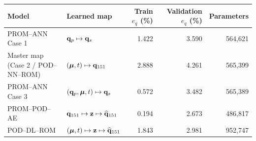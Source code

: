 \begin{tabular}{llrrr}
\toprule
Model & Learned map & Train $e_q$ (\%) & Validation $e_q$ (\%) & Parameters \\
\midrule
PROM--ANN Case 1 & $\mathbf q_p\mapsto\mathbf q_s$ & 1.422 & 3.590 & 564,621 \\
Master map (Case 2 / POD--NN--ROM) & $(\bm\mu,t)\mapsto\mathbf q_{151}$ & 2.888 & 4.261 & 565,399 \\
PROM--ANN Case 3 & $(\mathbf q_p,\bm\mu,t)\mapsto\mathbf q_s$ & 0.572 & 3.482 & 565,389 \\
PROM--POD--AE & $\mathbf q_{151}\mapsto\mathbf z\mapsto\widehat{\mathbf q}_{151}$ & 0.194 & 2.673 & 486,817 \\
POD--DL--ROM & $(\bm\mu,t)\mapsto\mathbf z\mapsto\widehat{\mathbf q}_{151}$ & 1.843 & 2.981 & 952,747 \\
\bottomrule
\end{tabular}
